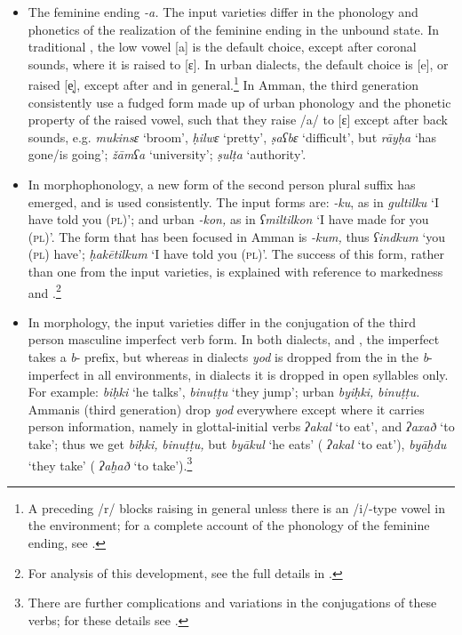\documentclass[output=paper]{langsci/langscibook}
\begin{document}
\begin{itemize}

\item[]
The feminine ending \textit{{}-a.} The input varieties differ in the phonology and phonetics of the realization of the feminine ending in the unbound state. In traditional , the low vowel [a] is the default choice, except after coronal sounds, where it is raised to [ɛ]. In urban  dialects, the default choice is [e], or raised [e̝], except after  and  in general.\footnote{A preceding /r/ blocks raising in general unless there is an /i/-type vowel in the environment; for a complete account of the phonology of the feminine ending, see \citet{Al-WerEtAl2015}.} In Amman, the third generation consistently use a fudged form made up of urban  phonology and the  phonetic property of the raised vowel, such that they raise /a/ to [ɛ] except after back sounds, e.g. \textit{mukinsɛ} ‘broom', \textit{ḥilwɛ} ‘pretty’, \textit{ṣaʕbɛ} ‘difficult’, but \textit{rāyḥa} ‘has gone/is going’; \textit{žāmʕa} ‘university’; \textit{ṣulṭa} ‘authority’.

\item[]In morphophonology, a new form of the second person plural suffix has emerged, and is used consistently. The input forms are:  \textit{{}-ku}, as in \textit{gultilku} ‘I have told you (\textsc{pl})’; and urban  \textit{{}-kon,} as in \textit{ʕmiltilkon} ‘I have made for you (\textsc{pl})’. The form that has been focused in Amman is \textit{{}-kum,} thus \textit{ʕindkum} ‘you (\textsc{pl}) have’; \textit{ḥakētilkum} ‘I have told you (\textsc{pl)}’. The success of this form, rather than one from the input varieties, is explained with reference to markedness and .\footnote{For analysis of this development, see the full details in \citet{Al-Wer2003kum}.}

\item[]In morphology, the input varieties differ in the conjugation of the third person masculine imperfect verb form. In both dialects,  and , the imperfect takes a \textit{b}{}- prefix, but whereas in  dialects \textit{yod} is dropped from the  in the \textit{b}{}-imperfect in all environments, in  dialects it is dropped in open syllables only. For example:  \textit{biḥki} ‘he talks’, \textit{binuṭṭu} ‘they jump’; urban  \textit{byiḥki,} \textit{binuṭṭu.} Ammanis (third generation) drop \textit{yod} everywhere except where it carries person information, namely in glottal-initial verbs \textit{ʔakal} ‘to eat’, and \textit{ʔaxað} ‘to take’; thus we get \textit{biḥki,} \textit{binuṭṭu,} but \textit{byākul} ‘he eats’ ( \textit{ʔakal} ‘to eat’), \textit{byāḫdu} ‘they take’ ( \textit{ʔaḫað} ‘to take’).\footnote{There are further complications and variations in the conjugations of these verbs; for these details see \citet{Al-Wer2014}.}
\end{itemize}
\end{document}
